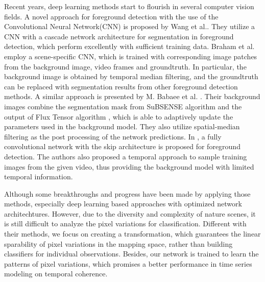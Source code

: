 \documentclass[journal]{IEEEtran}
\begin{document}
%
Recent years, deep learning methods start to flourish in several computer vision fields. A novel approach for foreground detection with the use of the Convolutional Neural Network(CNN) is proposed by Wang et al.\cite{wang2016PRL}.
They utilize a CNN with a cascade network architecture for segmentation in foreground detection, which perform excellently with sufficient training data.
%
Braham et al. \cite{Braham2016deep} employ a scene-specific CNN, which is trained with corresponding image patches from the background image, video frames and groundtruth. In particular, the background image is obtained by temporal median filtering, and the groundtruth can be replaced with segmentation results from other foreground detection methods.
A similar approach is presented by M. Babaee et al. \cite{Babaee2017deep}. Their background images combine the segmentation mask from SuBSENSE\cite{St-Charles2015SuBSENSE} algorithm and the output of Flux Tensor algorithm \cite{Wang2014FTSG}, which is able to adaptively update the parameters used in the background model. They also utilize spatial-median filtering as the post processing of the network predictions.
In \cite{Yang2018DBMF}, a fully convolutional network with the skip architecture is proposed for foreground detection. 
The authors also proposed a temporal approach to sample training images from the given video, thus providing the background model with limited temporal information. 

Although some breakthroughs and progress have been made by applying those methods, especially deep learning based approaches with optimized network architechtures. 
However, due to the diversity and complexity of nature scenes, it is still difficult to analyze the pixel variations for classification. 
Different with their methods, we focus on creating a transformation, which guarantees the linear sparability of pixel variations in the mapping space, rather than building classifiers for individual observations.
%
Besides, our network is trained to learn the patterns of pixel variations, which promises a better performance in time series modeling on temporal coherence.
%
\end{document}

